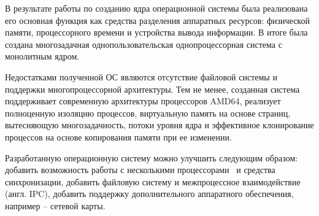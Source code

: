 \Conclusion

В результате работы по созданию ядра операционной системы была реализована его
основная функция как средства разделения аппаратных ресурсов: физической памяти,
процессорного времени и устройства вывода информации. В итоге была создана
многозадачная однопользовательская однопроцессорная система с монолитным ядром.

Недостатками полученной ОС являются отсутствие файловой системы и поддержки
многопроцессорной архитектуры. Тем не менее, созданная система поддерживает
современную архитектуры процессоров AMD64, реализует
полноценную изоляцию процессов, виртуальную память на основе страниц, вытесняющую
многозадачность, потоки уровня ядра и эффективное клонирование процессов на
основе копирования памяти при ее изменении.

Разработанную операционную систему можно улучшить следующим образом: добавить возможность
работы с несколькими процессорами~\cite{mp} и средства синхронизации,
добавить файловую систему и межпроцессное взаимодействие (англ. IPC), добавить
поддержку дополнительного аппаратного обеспечения, например -- сетевой карты.
